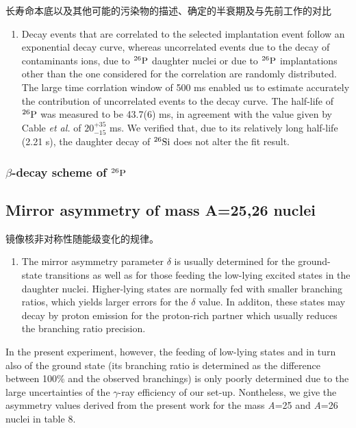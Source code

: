 \documentclass[a4paper]{article}
\begin{document}
长寿命本底以及其他可能的污染物的描述、确定的半衰期及与先前工作的对比
\begin{enumerate}
    \item Decay events that are correlated to the selected implantation event follow an exponential decay curve, whereas uncorrelated events due to the decay of contaminants ions, due to $^{26}\textnormal{P}$ daughter nuclei or due to $^{26}\textnormal{P}$ implantations other than the one considered for the correlation are randomly distributed. The large time corrlation window of 500 ms enabled us to estimate accurately the contribution of uncorrelated events to the decay curve. The half-life of $^{26}\textnormal{P}$ was measured to be 43.7(6) ms, in agreement with the value given by Cable \textit{et al.} of $20_{-15}^{+35}$ ms. We verified that, due to its relatively long half-life (2.21 s), the daughter decay of $^{26}\textnormal{Si}$ does not alter the fit result.
\end{enumerate}

\subsubsection{$\beta$-decay scheme of $^{26}\textnormal{P}$}
\subsection{Mirror asymmetry of mass A=25,26 nuclei}
镜像核非对称性随能级变化的规律。
\begin{enumerate}
    \item The mirror asymmetry parameter $\delta$ is usually determined for the ground-state transitions as well as for those feeding the low-lying excited states in the daughter nuclei. Higher-lying states are normally fed with smaller branching ratios, which yields larger errors for the $\delta$ value. In additon, these states may decay by proton emission for the proton-rich partner which usually reduces the branching ratio precision.
\end{enumerate}

In the present experiment, however, the feeding of low-lying states and in turn also of the ground state (its branching ratio is determined as the difference between 100\% and the observed branchings) is only poorly determined due to the large uncertainties of the $\gamma$-ray efficiency of our set-up. Nontheless, we give the asymmetry values derived from the present work for the mass \textit{A}=25 and \textit{A}=26 nuclei in table 8.
\end{document}

